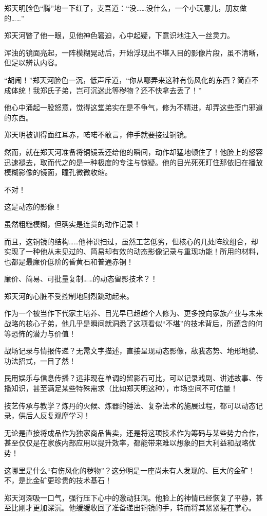 郑天明脸色“腾”地一下红了，支吾道：“没……没什么，一个小玩意儿，朋友做的……”

郑天河瞥了他一眼，见他神色窘迫，心中起疑，下意识地注入一丝灵力。

浑浊的镜面亮起，一阵模糊晃动后，开始浮现出不堪入目的影像片段，虽不清晰，但足以辨认内容。

“胡闹！”郑天河脸色一沉，低声斥道，“你从哪弄来这种有伤风化的东西？简直不成体统！我郑氏子弟，岂可沉迷此等秽物？还不快拿去丢了！”

他心中涌起一股怒意，觉得这堂弟实在是不争气，修为不精进，却弄这些歪门邪道的东西。

郑天明被训得面红耳赤，喏喏不敢言，伸手就要接过铜镜。

然而，就在郑天河准备将铜镜丢还给他的瞬间，动作却猛地顿住了！他脸上的怒容迅速褪去，取而代之的是一种极度的专注与惊疑。他的目光死死盯住那依旧在播放模糊影像的镜面，瞳孔微微收缩。

不对！

这是动态的影像！

虽然粗糙模糊，但确实是连贯的动作记录！

而且，这铜镜的结构……他神识扫过，虽然工艺低劣，但核心的几处阵纹组合，却实现了一种他从未见过的、简易却有效的动态影像记录与重现功能！所用的材料，也都是最廉价低阶的昏黄石和普通赤铜！

廉价、简易、可批量复制……的动态留影技术？！

郑天河的心脏不受控制地剧烈跳动起来。

作为一个被当作下代家主培养、目光早已超越个人修为、更多投向家族产业与未来战略的核心子弟，他几乎是瞬间就洞悉了这项看似“不堪”的技术背后，所蕴含的何等恐怖的潜力与价值！

战场记录与情报传递？无需文字描述，直接呈现动态影像，敌我态势、地形地貌、功法招式，一目了然！

民用娱乐与信息传播？远非现在单调的留影石可比，可以记录戏剧、讲述故事、传播知识，甚至满足某些特殊需求（比如郑天明这种），市场空间不可估量！

技艺传承与教学？炼丹的火候、炼器的锤法、复杂法术的施展过程，都可以动态记录，供后人反复观摩学习！

无论是直接将成品作为独家商品售卖，还是将这项技术作为筹码与某些势力合作，甚至仅仅是在家族内部应用以提升效率，都能带来难以想象的巨大利益和战略优势！

这哪里是什么“有伤风化的秽物”？这分明是一座尚未有人发现的、巨大的金矿！不，是比金矿更珍贵的技术基石！

郑天河深吸一口气，强行压下心中的激动狂澜。他脸上的神情已经恢复了平静，甚至比刚才更加深沉。他缓缓收回了准备递出铜镜的手，转而将其紧紧握在掌心。

